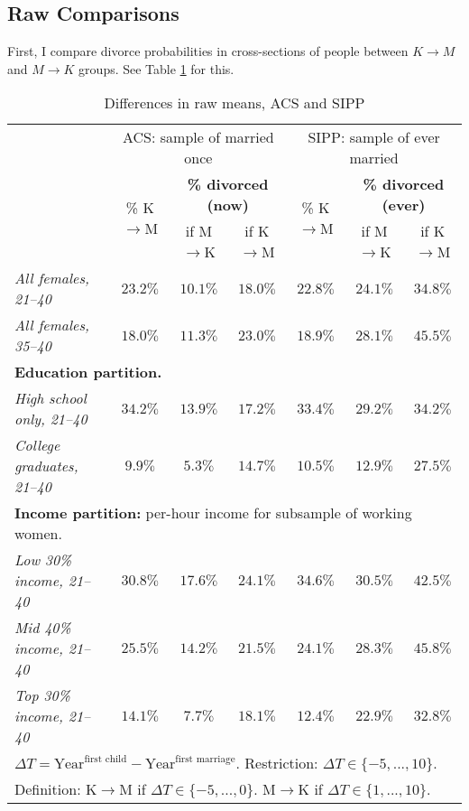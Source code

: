 \documentclass[12pt,letter]{article}
\begin{document}
\subsection{Raw Comparisons}
First, I compare divorce probabilities in cross-sections of people between $K\to M$ and $M\to K$ groups. See Table \ref{diff-raw} for this.

\begin{table}[h!]
\begin{center}
\begin{tabular}{|l|c||c|c||c||c|c|}\cline{2-7}
\multicolumn{1}{c|}{} & \multicolumn{3}{c||}{\small ACS: sample of married once} & \multicolumn{3}{c|}{\small SIPP: sample of  ever married} \\\cline{2-7}
\multicolumn{1}{c|}{}  & \multirow{2}{*}{\small \% K$\to$M}& \multicolumn{2}{c||}{\textbf{\% divorced (now)}} & \multirow{2}{*}{\footnotesize \% K$\to$M }& \multicolumn{2}{c|}{\textbf{\% divorced (ever)}} \\\cline{3-4}\cline{6-7}
\multicolumn{1}{c|}{}  &  &\small if M$\to$K &  \small if K$\to$M & & \small if M$\to$K & \small if K$\to$M \\\hline
\textit{All females, 21--40}  & $23.2\%$ & $10.1\%$ & $18.0\%$ & $22.8\%$ & $24.1\%$ & $34.8\%$ \\
\textit{All females, 35--40} & $18.0\%$ & $11.3\%$ & $23.0\%$ & $18.9\%$ & $28.1\%$ & $45.5\%$ \\\hline\hline
\multicolumn{7}{|p{0.9\linewidth}|}{\footnotesize \textbf{Education partition.}}\\\hline
\textit{High school only, 21--40} & $34.2\%$ & $13.9\%$ & $17.2\%$ & $33.4\%$ & $29.2\%$  & $34.2\%$ \\
\textit{College graduates, 21--40} & $9.9\%$ & $5.3\%$ & $14.7\%$ & $10.5\%$ & $12.9\%$ & $27.5\%$ \\\hline\hline
\multicolumn{7}{|p{0.9\linewidth}|}{\footnotesize \textbf{Income partition:} per-hour income for subsample of working women.}\\\hline
\textit{Low 30\% income, 21--40} & $30.8\%$ & $17.6\%$ & $24.1\%$ & $34.6\%$ & $30.5\%$ &  $42.5\%$ \\
\textit{Mid 40\% income, 21--40} & $25.5\%$ & $14.2\%$ & $21.5\%$ & $24.1\%$ & $28.3\%$ & $45.8\%$ \\
\textit{Top 30\% income, 21--40} & $14.1\%$ & $7.7\%$ & $18.1\%$ & $12.4\%$ & $22.9\%$  & $32.8\%$ \\\hline
\multicolumn{7}{|p{0.9\linewidth}|}{\footnotesize $\Delta T = \text{Year}^{\text{first child}} - \text{Year}^{\text{first marriage}}$. Restriction: $\Delta T \in \{-5,...,10\}$.}\\
\multicolumn{7}{|p{0.9\linewidth}|}{\footnotesize Definition: K$\to$M if $\Delta T \in \{-5,...,0\}$. M$\to$K if $\Delta T \in \{1,...,10\}$.}\\
\hline
\end{tabular}
\caption{Differences in raw means, ACS and SIPP\label{diff-raw}}
\end{center}
\end{table}
\end{document}
